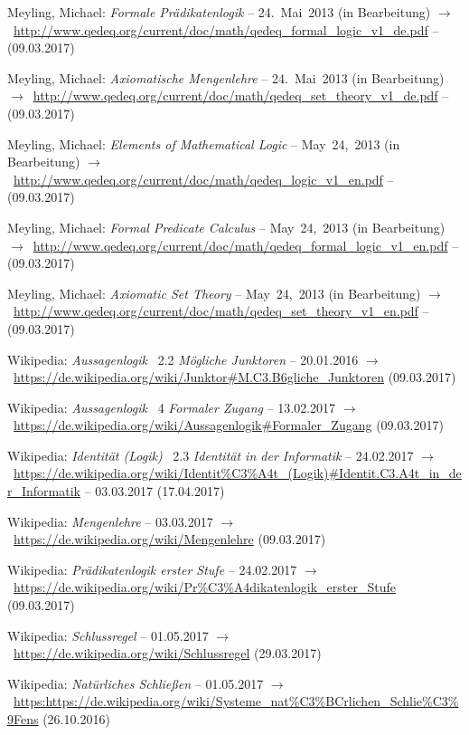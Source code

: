 \documentclass[english,ngerman,parskip=half,headsepline,footsepline,
	fleqn,notitlepage]{scrreprt}
\newcommand*{\Thispagestyle}{\thispagestyle{scrheadings}}
\newcommand*{\tourl}[1]{$\rightarrow$~\url{#1}}
\begin{document}
\begin{flushleft}
\begin{thebibliography}{12}
			Meyling, Michael:
			\emph{Formale Prädikatenlogik}
			-- 24.~Mai~2013 (in Bearbeitung)
			\tourl{http://www.qedeq.org/current/doc/math/qedeq\_formal\_logic\_v1\_de.pdf}
			-- (09.03.2017)

			Meyling, Michael:
			\emph{Axiomatische Mengenlehre}
			-- 24.~Mai~2013 (in Bearbeitung)
			\tourl{http://www.qedeq.org/current/doc/math/qedeq\_set\_theory\_v1\_de.pdf}
			-- (09.03.2017)

			Meyling, Michael:
			\emph{Elements of Mathematical Logic}
			-- May~24,~2013 (in Bearbeitung)
			\tourl{http://www.qedeq.org/current/doc/math/qedeq\_logic\_v1\_en.pdf}
			-- (09.03.2017)

			Meyling, Michael:
			\emph{Formal Predicate Calculus}
			-- May~24,~2013 (in Bearbeitung)
			\tourl{http://www.qedeq.org/current/doc/math/qedeq\_formal\_logic\_v1\_en.pdf}
			-- (09.03.2017)

			Meyling, Michael:
			\emph{Axiomatic Set Theory}
			-- May~24,~2013 (in Bearbeitung)
			\tourl{http://www.qedeq.org/current/doc/math/qedeq\_set\_theory\_v1\_en.pdf}
			-- (09.03.2017)

			Wikipedia:
			\emph{Aussagenlogik} \chaptername~2.2 \emph{Mögliche Junktoren}
			-- 20.01.2016
			\tourl{https://de.wikipedia.org/wiki/Junktor\#M.C3.B6gliche\_Junktoren}
			(09.03.2017)

			Wikipedia:
			\emph{Aussagenlogik} \chaptername~4 \emph{Formaler Zugang}
			-- 13.02.2017
			\tourl{https://de.wikipedia.org/wiki/Aussagenlogik\#Formaler\_Zugang}
			(09.03.2017)

			Wikipedia:
			\emph{Identität (Logik)} \chaptername~2.3
			\emph{Identität in der Informatik}
			-- 24.02.2017
			\tourl{https://de.wikipedia.org/wiki/Identit\%C3\%A4t\_(Logik)\#Identit.C3.A4t\_in\_der\_Informatik}
			-- 03.03.2017 (17.04.2017)

			Wikipedia:
			\emph{Mengenlehre}
			-- 03.03.2017
			\tourl{https://de.wikipedia.org/wiki/Mengenlehre}
			(09.03.2017)

			Wikipedia:
			\emph{Prädikatenlogik erster Stufe}
			-- 24.02.2017
			\tourl{https://de.wikipedia.org/wiki/Pr\%C3\%A4dikatenlogik\_erster\_Stufe}
			(09.03.2017)

			Wikipedia:
			\emph{Schlussregel}
			-- 01.05.2017
			\tourl{https://de.wikipedia.org/wiki/Schlussregel}
			(29.03.2017)

			Wikipedia:
			\emph{Natürliches Schließen}
			-- 01.05.2017
			\tourl{https:https://de.wikipedia.org/wiki/Systeme\_nat\%C3\%BCrlichen\_Schlie\%C3\%9Fens}
			(26.10.2016)

		\end{thebibliography}
	\end{flushleft}
	\Thispagestyle%
\end{document}
